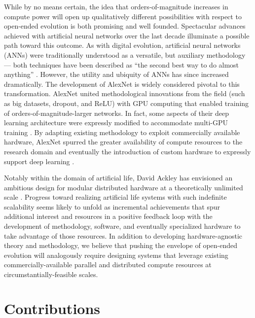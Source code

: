 While by no means certain, the idea that orders-of-magnitude increases in compute power will open up qualitatively different possibilities with respect to open-ended evolution is both promising and well founded.
Spectacular advances achieved with artificial neural networks over the last decade illuminate a possible path toward this outcome. As with digital evolution, artificial neural networks (ANNs) were traditionally understood as a versatile, but auxiliary methodology — both techniques have been described as ``the second best way to do almost anything'' \citep{miaoulis2008intelligent,eiben2015introduction}.
However, the utility and ubiquity of ANNs has since increased dramatically. The development of AlexNet is widely considered pivotal to this transformation. AlexNet united methodological innovations from the field (such as big datasets, dropout, and ReLU) with GPU computing that enabled training of orders-of-magnitude-larger networks.
In fact, some aspects of their deep learning architecture were expressly modified to accommodate multi-GPU training \citep{krizhevsky2012imagenet}.
By adapting existing methodology to exploit commercially available hardware, AlexNet spurred the greater availability of compute resources to the research domain and eventually the introduction of custom hardware to expressly support deep learning \citep{jouppi2017datacenter}.

Notably within the domain of artificial life, David Ackley has envisioned an ambitious design for modular distributed hardware at a theoretically unlimited scale \citep{ackley2011pursue}.
Progress toward realizing artificial life systems with such indefinite scalability seems likely to unfold as incremental achievements that spur additional interest and resources in a positive feedback loop with the development of methodology, software, and eventually specialized hardware to take advantage of those resources.
In addition to developing hardware-agnostic theory and methodology, we believe that pushing the envelope of open-ended evolution will analogously require designing systems that leverage existing commercially-available parallel and distributed compute resources at circumstantially-feasible scales.

\section{Contributions}

